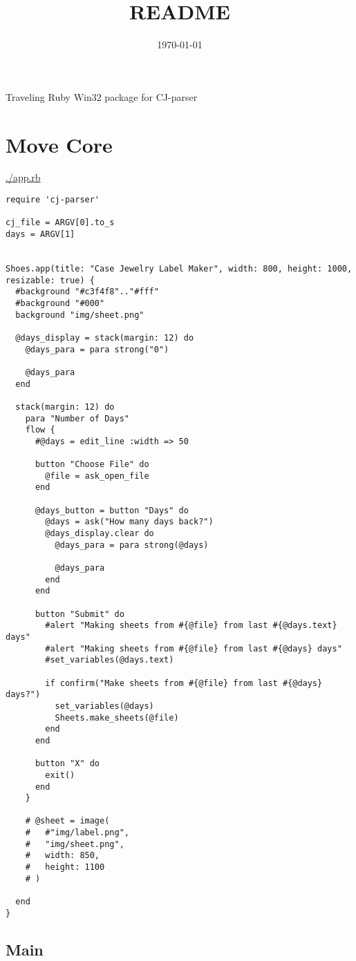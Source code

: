 \documentclass[11pt]{article}
\date{\today}
\title{README}
\begin{document}
\maketitle
\tableofcontents

Traveling Ruby Win32 package for 
CJ-parser

\section{Move Core}
\label{sec-1}

\url{./app.rb}

\begin{verbatim}
require 'cj-parser'

cj_file = ARGV[0].to_s
days = ARGV[1]


Shoes.app(title: "Case Jewelry Label Maker", width: 800, height: 1000, resizable: true) {
  #background "#c3f4f8".."#fff"
  #background "#000"
  background "img/sheet.png"

  @days_display = stack(margin: 12) do
    @days_para = para strong("0")

    @days_para
  end

  stack(margin: 12) do
    para "Number of Days"
    flow {
      #@days = edit_line :width => 50

      button "Choose File" do
        @file = ask_open_file
      end

      @days_button = button "Days" do
        @days = ask("How many days back?")
        @days_display.clear do
          @days_para = para strong(@days)

          @days_para
        end
      end

      button "Submit" do
        #alert "Making sheets from #{@file} from last #{@days.text} days"
        #alert "Making sheets from #{@file} from last #{@days} days"
        #set_variables(@days.text)

        if confirm("Make sheets from #{@file} from last #{@days} days?")
          set_variables(@days)
          Sheets.make_sheets(@file)
        end
      end

      button "X" do
        exit()
      end
    }

    # @sheet = image(
    #   #"img/label.png",
    #   "img/sheet.png",
    #   width: 850,
    #   height: 1100
    # )

  end
}
\end{verbatim}

\subsection{Main}
\label{sec-1-1}
\end{document}
